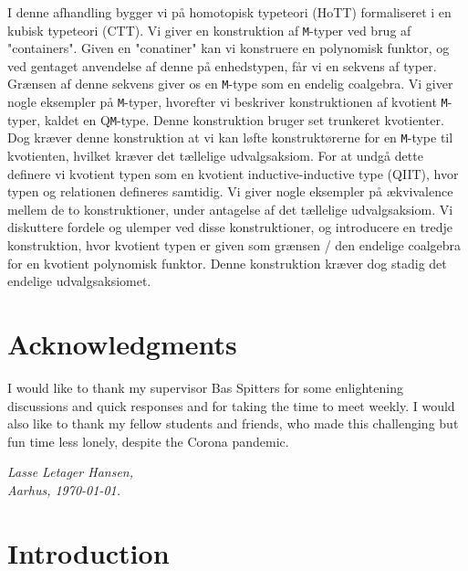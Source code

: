 \documentclass[twoside,11pt,openright]{report}
\theoremstyle{plain} %
\theoremstyle{definition}
\theoremstyle{remark}
\begin{document}
I denne afhandling bygger vi på homotopisk typeteori (HoTT) formaliseret i en kubisk typeteori (CTT). Vi giver en konstruktion af \texttt{M}-typer ved brug af "containers". Given en "conatiner" kan vi konstruere en polynomisk funktor, og ved gentaget anvendelse af denne på enhedstypen, får vi en sekvens af typer. Grænsen af denne sekvens giver os en \texttt{M}-type som en endelig coalgebra. Vi giver nogle eksempler på \texttt{M}-typer, hvorefter vi beskriver konstruktionen af kvotient \texttt{M}-typer, kaldet en Q\texttt{M}-type. Denne konstruktion bruger set trunkeret kvotienter. Dog kræver denne konstruktion at vi kan løfte konstruktørerne for en \texttt{M}-type til kvotienten, hvilket kræver det tællelige udvalgsaksiom. For at undgå dette definere vi kvotient typen som en kvotient inductive-inductive type (QIIT), hvor typen og relationen defineres samtidig. Vi giver nogle eksempler på ækvivalence mellem de to konstruktioner, under antagelse af det tællelige udvalgsaksiom. Vi diskuttere fordele og ulemper ved disse konstruktioner, og introducere en tredje konstruktion, hvor kvotient typen er given som grænsen / den endelige coalgebra for en kvotient polynomisk funktor. Denne konstruktion kræver dog stadig det endelige udvalgsaksiomet.

\chapter*{Acknowledgments}
I would like to thank my supervisor Bas Spitters for some enlightening discussions and quick responses and for taking the time to meet weekly. I would also like to thank my fellow students and friends, who made this challenging but fun time less lonely, despite the Corona pandemic.
\vspace{2ex}
\begin{flushright}
  \emph{Lasse Letager Hansen,}\\
  \emph{Aarhus, \today.}
\end{flushright}

\tableofcontents
\cleardoublepage
{}
\setcounter{secnumdepth}{3} %


\chapter{Introduction} %
\label{ch:intro}
\end{document}
